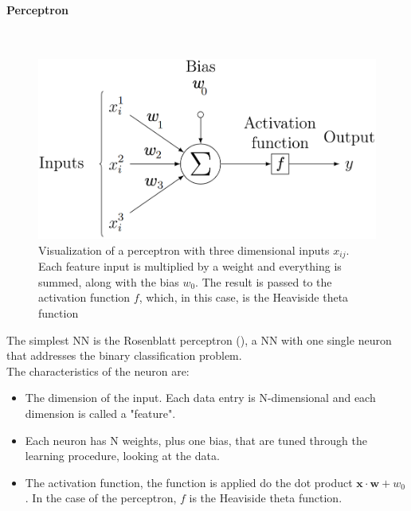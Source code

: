\paragraph*{Perceptron}\hspace{1cm}\\
\begin{minipage}{\linewidth}
    \begin{minipage}{0.46\linewidth}
        
    \begin{figure}[H]
        \centering
        \includegraphics[width=\linewidth]{fig//chap05-stats/perceptron.png}
        \vspace{0.5cm}
        \caption{Visualization of a perceptron with three dimensional inputs $x_{ij}$. Each feature input is multiplied by a weight and everything is summed, along with the bias $w_0$. The result is passed to the activation function $f$, which, in this case, is the Heaviside theta function}
        \label{fig:perceptron}
    \end{figure}
    \end{minipage}
    \hfill
    \begin{minipage}{0.51\linewidth}
        The simplest NN is the Rosenblatt perceptron \cite{Rosenblatt1958TheBrain} (), a NN with one single neuron that addresses the binary classification problem.\\
        The characteristics of the neuron are:
            \begin{itemize}
                \item The dimension of the input. Each data entry is N-dimensional and each dimension is called a "feature".

                \item Each neuron has N weights, plus one bias, that are tuned through the learning procedure, looking at the data.

                \item The activation function, \ie the function is applied do the dot product $\bm{x}\cdot \bm{w}+w_0$.
                In the case of the perceptron, $f$ is the Heaviside theta function.
            \end{itemize}
    \end{minipage}
    \vspace{0.75cm}
\end{minipage}
